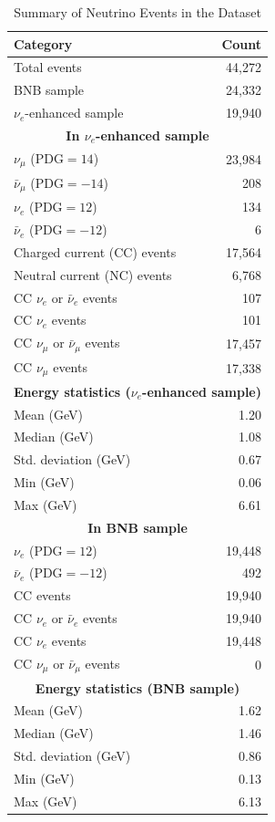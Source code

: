 \documentclass{pracalicmgr}
\begin{document}
\begin{table}[H]
\centering
\caption{Summary of Neutrino Events in the Dataset}
\begin{tabular}{|l|r|}
\hline
\textbf{Category} & \textbf{Count} \\
\hline
Total events & 44,272 \\
BNB sample & 24,332 \\
$\nu_e$-enhanced sample & 19,940 \\
\hline
\multicolumn{2}{|c|}{\textbf{In $\nu_e$-enhanced sample}} \\
\hline
$\nu_{\mu}$ ($\text{PDG}=14$) & 23,984 \\
$\bar{\nu}_{\mu}$ ($\text{PDG}=-14$) & 208 \\
$\nu_e$ ($\text{PDG}=12$) & 134 \\
$\bar{\nu}_e$ ($\text{PDG}=-12$) & 6 \\
Charged current (CC) events & 17,564 \\
Neutral current (NC) events & 6,768 \\
CC $\nu_e$ or $\bar{\nu}_e$ events & 107 \\
CC $\nu_e$ events & 101 \\
CC $\nu_{\mu}$ or $\bar{\nu}_{\mu}$ events & 17,457 \\
CC $\nu_{\mu}$ events & 17,338 \\
\hline
\multicolumn{2}{|c|}{\textbf{Energy statistics ($\nu_e$-enhanced sample)}} \\
\hline
Mean (GeV) & 1.20 \\
Median (GeV) & 1.08 \\
Std. deviation (GeV) & 0.67 \\
Min (GeV) & 0.06 \\
Max (GeV) & 6.61 \\
\hline
\multicolumn{2}{|c|}{\textbf{In BNB sample}} \\
\hline
$\nu_e$ ($\text{PDG}=12$) & 19,448 \\
$\bar{\nu}_e$ ($\text{PDG}=-12$) & 492 \\
CC events & 19,940 \\
CC $\nu_e$ or $\bar{\nu}_e$ events & 19,940 \\
CC $\nu_e$ events & 19,448 \\
CC $\nu_{\mu}$ or $\bar{\nu}_{\mu}$ events & 0 \\
\hline
\multicolumn{2}{|c|}{\textbf{Energy statistics (BNB sample)}} \\
\hline
Mean (GeV) & 1.62 \\
Median (GeV) & 1.46 \\
Std. deviation (GeV) & 0.86 \\
Min (GeV) & 0.13 \\
Max (GeV) & 6.13 \\
\hline
\end{tabular}
\end{table}
\end{document}
